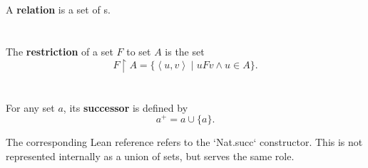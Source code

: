 \documentclass{report}
\newcommand{\pair}[1]{\left< #1 \right>}
\begin{document}
\section{}%

A \textbf{relation} is a set of s.

\begin{definition}

  \statementpadding



\end{definition}

\section{}%

The \textbf{restriction} of a set $F$ to set $A$ is the set
  $$F \restriction A = \{\pair{u, v} \mid uFv \land u \in A\}.$$

\begin{definition}


\end{definition}

\section{}%
\label{ref:successor}

For any set $a$, its \textbf{successor} is defined by $$a^+ = a \cup \{a\}.$$

\begin{note}
  The corresponding Lean reference refers to the `Nat.succ` constructor.
  This is not represented internally as a union of sets, but serves the same
    role.
\end{note}

\begin{definition}


\end{definition}

\section{}%
\end{document}
